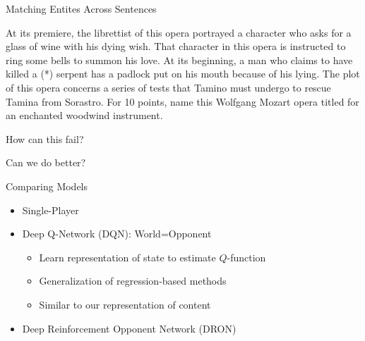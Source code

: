 \documentclass[xcolor=dvipsnames]{beamer}
\newcommand{\gfxq}[2]{
\begin{center}
	\texttt{[image: qb/\#1]}
\end{center}
}
\begin{document}
\begin{frame}{Matching Entites Across Sentences}

\begin{block}{}

    At its premiere, \alert<3>{the librettist of this opera} portrayed
    \alert<4>{a character who asks for a glass of wine with his dying wish}. \alert<4>{That
    character} in this opera is instructed to ring some bells to summon
    his love. At its beginning, \alert<5>{a man} who claims to have killed a (*)
    serpent has a padlock put on \alert<5>{his} mouth because of \alert<5>{his} lying. The
    plot of this opera concerns a series of tests that \alert<5>{Tamino} must
    undergo to rescue Tamina from Sorastro. For 10 points, name this
    Wolfgang Mozart opera titled for \alert<6>{an enchanted woodwind instrument}.
\end{block}



\end{frame}



\begin{frame}{How can this fail?}

  \only<1>{\gfxq{opponent_fail1}{.8}}
  \only<2>{\gfxq{opponent_fail2}{.8}}
  \only<3>{\gfxq{opponent_fail3}{.8}}
  \only<4>{\gfxq{opponent_fail4}{.8}}
  \only<5>{\gfxq{opponent_fail5}{.8}}
  \only<6>{\gfxq{opponent_fail6}{.8}}
  \only<7>{\gfxq{opponent_fail7}{.8}}

\end{frame}

\begin{frame}{Can we do better?}

  \only<1>{\gfxq{dqn_overview2}{.8}}
  \only<2>{\gfxq{dqn_overview3}{.8}}
  \only<3>{\gfxq{dqn_overview4}{.8}}

\end{frame}


\begin{frame}{Comparing Models}

  \begin{itemize}
    \item Single-Player
    \item Deep Q-Network (DQN): World=Opponent~\cite{mnih-15}
      \begin{itemize}
        \item Learn representation of state to estimate $Q$-function
        \item Generalization of regression-based methods
        \item Similar to our representation of content
      \end{itemize}
    \item Deep Reinforcement Opponent Network (DRON)
  \end{itemize}

\end{frame}
\end{document}
